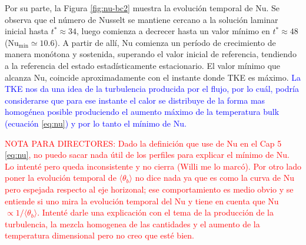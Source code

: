 Por su parte, la Figura \ref{fig:nu-bc2} muestra la evolución temporal de Nu. Se observa que el número de Nusselt se mantiene cercano a la solución laminar inicial hasta $t^* \approx 34$, luego comienza a decrecer hasta un valor mínimo en $t^* \approx 48$ ($\text{Nu}_{\text{min}} \simeq 10\text{.}6$). A partir de allí, Nu comienza un período de crecimiento de manera monótona y sostenida, superando el valor inicial de referencia, tendiendo a la referencia del estado estadísticamente estacionario. El valor mínimo que alcanza Nu, coincide aproximadamente con el instante donde TKE es máximo. \textcolor{blue}{La TKE nos da una idea de la turbulencia producida por el flujo, por lo cuál, podría considerarse que para ese instante el calor se distribuye de la forma mas homogénea posible produciendo el aumento máximo de la temperatura bulk (ecuación \ref{eq:nu}) y por lo tanto el mínimo de Nu.}  

\textcolor{red}{NOTA PARA DIRECTORES: Dado la definición que use de Nu en el Cap 5 \ref{eq:nu}, no puedo sacar nada útil de los perfiles para explicar el mínimo de Nu. Lo intenté pero queda inconsistente y no cierra (Willi me lo marcó). Por otro lado poner la evolución temporal de $\langle \theta_b \rangle$ no dice nada ya que es como la curva de Nu pero espejada respecto al eje horizonal; ese comportamiento es medio obvio y se entiende si uno mira la evolución  temporal  del Nu y tiene en cuenta que Nu $\propto 1/\langle \theta_b \rangle$. Intenté darle una explicación con el tema de la producción de la turbulencia, la mezcla homogenea de las cantidades y el aumento de la temperatura dimensional pero no creo que esté bien.}



